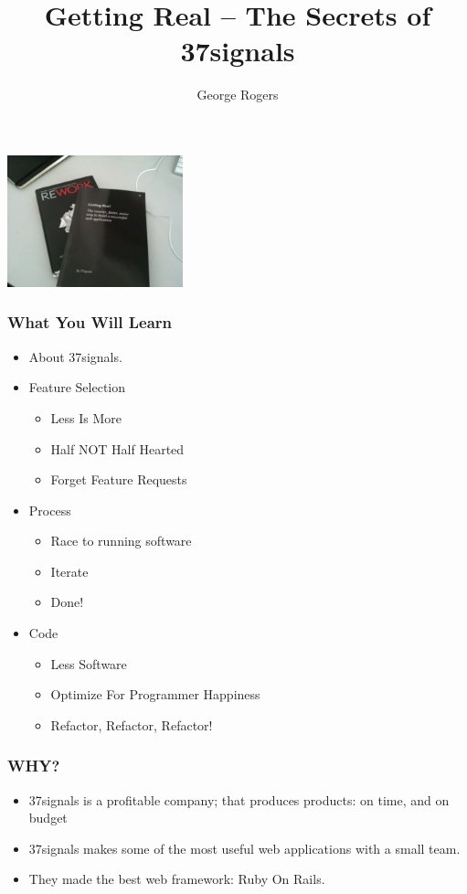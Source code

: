 \documentclass[10pt]{beamer}
\title{Getting Real -- The Secrets of 37signals}
\author{George Rogers}
\begin{document}
\begin{frame}
  \titlepage
  \includegraphics[width=2in]{books}
\end{frame}
\begin{frame}
  \frametitle{What You Will Learn}
  \pause
  \begin{itemize}
  \item About 37signals.
  \pause
  \item Feature Selection
    \begin{itemize}
    \item Less Is More
    \item Half NOT Half Hearted
    \item Forget Feature Requests
    \end{itemize}
  \pause
  \item Process
    \begin{itemize}
    \item Race to running software
    \item Iterate
    \item Done!
    \end{itemize}
  \pause
  \item Code
    \begin{itemize}
    \item Less Software
    \item Optimize For Programmer Happiness
    \item Refactor, Refactor, Refactor!
    \end{itemize}
  \end{itemize}
\end{frame}
\begin{frame}
  \frametitle{WHY?}
  \pause
  \begin{itemize}
    \item 37signals is a profitable company; that produces products:
      on time, and on budget
    \pause
    \item 37signals makes some of the most useful web applications with
      a small team.
    \pause
    \item They made the best web framework: Ruby On Rails.
  \end{itemize}
\end{frame}
\end{document}
